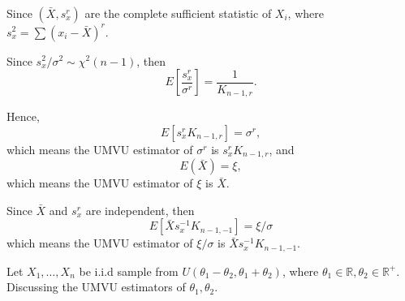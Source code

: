 \begin{solution}
\begin{enumerate}
        Since $(\bar{X},s_x^r)$ are the complete sufficient statistic of $X_i$, where $s_x^2=\sum\left(x_{i}-\bar{X}\right)^r$.

        Since $s_x^2/\sigma^2\sim\chi^2(n-1)$, then
        \begin{equation*}
            E\left[\frac{s_x^r}{\sigma^r}\right]=\frac{1}{K_{n-1,r}}.
        \end{equation*}

        Hence,
        \begin{equation*}
            E\left[s_x^rK_{n-1,r}\right]=\sigma^r,
        \end{equation*}
        which means the UMVU estimator of $\sigma^r$ is $s_x^rK_{n-1,r}$,
        and
        \begin{equation*}
            E(\bar{X})=\xi,
        \end{equation*}
        which means the UMVU estimator of $\xi$ is $\bar{X}$.

        Since $\bar{X}$ and $s_x^r$ are independent, then
        \begin{equation*}
            E[\bar{X}s_x^{-1}K_{n-1,-1}]=\xi/\sigma
        \end{equation*}
        which means the UMVU estimator of $\xi/\sigma$ is $\bar{X}s_x^{-1}K_{n-1,-1}$.
    \end{enumerate}
\end{solution}

\begin{example}[]
    Let $X_{1},\ldots,X_{n}$ be i.i.d sample from $U\left(\theta_1-\theta_2,\theta_1+\theta_2\right)$, where $\theta_1\in\mathbb{R},\theta_2\in\mathbb{R}^+$. Discussing the UMVU estimators of $\theta_1,\theta_2$.
\end{example}

